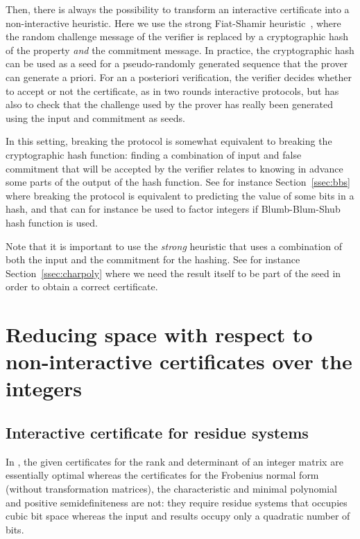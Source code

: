 \documentclass{article}
\newcommand{\customlinebreak}{}
\newcommand{\psdness}{positive semidefiniteness\xspace}
\begin{document}
Then, there is always the possibility to transform an interactive certificate
into a non-interactive heuristic. 
Here we use the strong Fiat-Shamir
heuristic~\cite{Fiat:1986:Shamir,Bellare:1993:randomoracle,Bernhard:2012:fiatshamir},
where the random challenge message of the verifier is replaced by a
cryptographic hash of the property {\em and} the commitment message.
In practice, the cryptographic hash can be used as a seed for a pseudo-randomly
generated sequence that the prover can generate a priori. 
For an a posteriori verification, the verifier decides whether to accept or not
the certificate, as in two rounds interactive protocols, but has also to check
that the challenge used by the prover has really been generated using the input
and commitment as seeds.

In this setting, breaking the protocol is somewhat equivalent to breaking the
cryptographic hash function: finding a combination of input and false commitment
that will be accepted by the verifier relates to knowing in advance some parts
of the output of the hash function.
See for instance Section~\ref{ssec:bbs} where
breaking the protocol is equivalent to predicting the value of some bits in a
hash, and that can for instance be used to factor integers if Blumb-Blum-Shub
hash function is used. 

Note that it is important to use the {\em strong} heuristic that uses a
combination of both the input and the commitment for the hashing.
See for instance Section~\ref{ssec:charpoly} where we need the result itself to
be part of the seed in order to obtain a correct certificate.

 
 
\section{Reducing space with respect to non-interactive certificates{\customlinebreak} over the
  integers}\label{sec:ints}
\subsection{Interactive certificate for residue systems}
In \cite[Theorem~5]{Kaltofen:2011:quadcert}, the given certificates for the rank
and determinant of an integer matrix are essentially optimal whereas the
certificates for the Frobenius normal form (without transformation matrices),
the characteristic and minimal polynomial and \psdness are not: they require
residue systems that occupies cubic bit space whereas the input and results
occupy only a quadratic number of bits.
 
\end{document}
